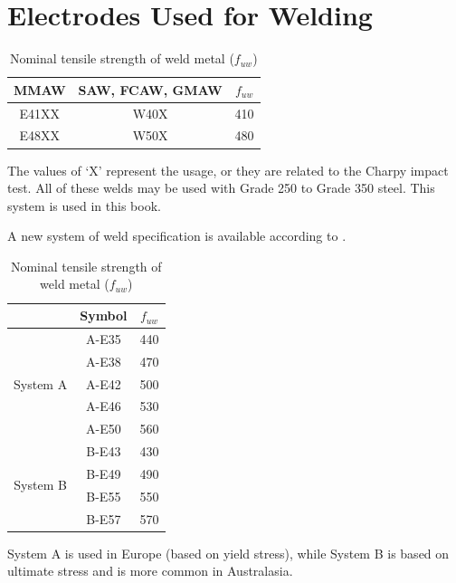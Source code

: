 \section{Electrodes Used for Welding}
\begin{table}[H]
\centering\footnotesize
\caption{Nominal tensile strength of weld metal ($f_{uw}$)}
\begin{tabular}{ccc}
	\toprule
	MMAW  & SAW, FCAW, GMAW &    $f_{uw}$    \\ \midrule
	E41XX &      W40X       & \SI{410}{\mpa} \\
	E48XX &      W50X       & \SI{480}{\mpa} \\ \bottomrule
\end{tabular}
\end{table}
The values of `X' represent the usage, or they are related to the Charpy impact test.
All of these welds may be used with Grade 250 to Grade 350 steel.
This system is used in this book.

A new system of weld specification is available according to \ASNZSWELD{}.
\begin{table}[H]
\centering\footnotesize
\caption{Nominal tensile strength of weld metal ($f_{uw}$)}
\begin{tabular}{ccc}
	\toprule
	                          &       Symbol        &           $f_{uw}$           \\ \midrule
	\multirow{5}{*}{System A} &        A-E35        &        \SI{440}{\mpa}        \\
	                          &        A-E38        &        \SI{470}{\mpa}        \\
	                          &        A-E42        &        \SI{500}{\mpa}        \\
	                          &        A-E46        &        \SI{530}{\mpa}        \\
	                          &        A-E50        &        \SI{560}{\mpa}        \\ \midrule
	\multirow{4}{*}{System B} &        B-E43        &        \SI{430}{\mpa}        \\
	                          & \color{cc0066}B-E49 & \color{cc0066}\SI{490}{\mpa} \\
	                          &        B-E55        &        \SI{550}{\mpa}        \\
	                          &        B-E57        &        \SI{570}{\mpa}        \\ \bottomrule
\end{tabular}
\end{table}
System A is used in Europe (based on yield stress), while System B is based on ultimate stress and is more common in Australasia.

